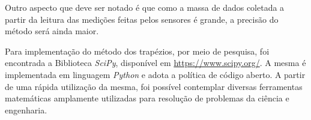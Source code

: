 Outro aspecto que deve ser notado é que como a massa de dados coletada a partir da leitura das medições feitas pelos sensores é grande, a
precisão do método será ainda maior.

Para implementação do método dos trapézios, por meio de pesquisa, foi encontrada a Biblioteca \textit{SciPy}, disponível em \href{https://www.scipy.org/}{https://www.scipy.org/}. A mesma é implementada em linguagem \textit{Python} e adota a política de código aberto. A partir de uma rápida utilização da mesma, foi possível contemplar diversas ferramentas matemáticas amplamente utilizadas para resolução de problemas da ciência e engenharia.